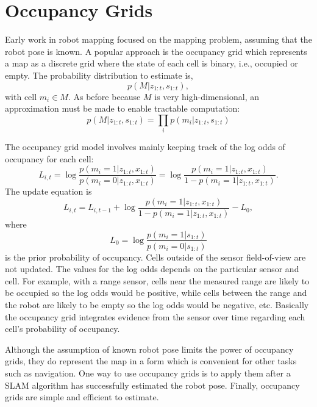 \documentclass{article}
\begin{document}
\section{Occupancy Grids}

Early work in robot mapping focused on the mapping problem, assuming that the robot pose is known.  A popular approach is the occupancy grid which represents a map as a discrete grid where the state of each cell is binary, i.e., occupied or empty.  The probability distribution to estimate is,
\begin{equation}
p(M | z_{1:t}, s_{1:t}),
\end{equation}
with cell $m_i \in M$.  As before because $M$ is very high-dimensional, an approximation must be made to enable tractable computation:
\begin{equation}
p(M | z_{1:t}, s_{1:t}) = \prod_i p(m_i | z_{1:t}, s_{1:t})
\end{equation}

The occupancy grid model involves mainly keeping track of the log odds of occupancy for each cell:
\begin{equation}
L_{i, t} =\log \frac{p(m_i=1|z_{1:t}, x_{1:t})}{p(m_i=0|z_{1:t}, x_{1:t})} = \log \frac{p(m_i=1|z_{1:t}, x_{1:t})}{1 - p(m_i=1|z_{1:t}, x_{1:t})}. 
\end{equation}
The update equation is
\begin{equation}
L_{i, t} = L_{i, t-1} +  \log \frac{p(m_i=1|z_{1:t}, x_{1:t})}{1 - p(m_i=1|z_{1:t}, x_{1:t})}  - L_0,
\end{equation}
where
\begin{equation}
L_0 = \log\frac{p(m_i=1 | s_{1:t})}{p(m_i=0 | s_{1:t})}
\end{equation}
is the prior probability of occupancy.  Cells outside of the sensor field-of-view are not updated.  The values for the log odds depends on the particular sensor and cell.  For example, with a range sensor, cells near the measured range are likely to be occupied so the log odds would be positive, while cells between the range and the robot are likely to be empty so the log odds would be negative, etc.  Basically the occupancy grid integrates evidence from the sensor over time regarding each cell's probability of occupancy.

Although the assumption of known robot pose limits the power of occupancy grids, they do represent the map in a form which is convenient for other tasks such as navigation.  One way to use occupancy grids is to apply them after a SLAM algorithm has successfully estimated the robot pose.  Finally, occupancy grids are simple and efficient to estimate.
\end{document}
